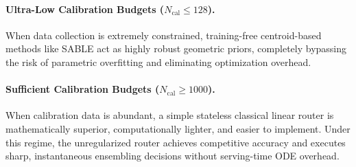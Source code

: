 \paragraph{Ultra-Low Calibration Budgets ($N_{\text{cal}} \le 128$).}
When data collection is extremely constrained, training-free centroid-based methods like SABLE act as highly robust geometric priors, completely bypassing the risk of parametric overfitting and eliminating optimization overhead.

\paragraph{Sufficient Calibration Budgets ($N_{\text{cal}} \ge 1000$).}
When calibration data is abundant, a simple stateless classical linear router is mathematically superior, computationally lighter, and easier to implement. Under this regime, the unregularized router achieves competitive accuracy and executes sharp, instantaneous ensembling decisions without serving-time ODE overhead.


